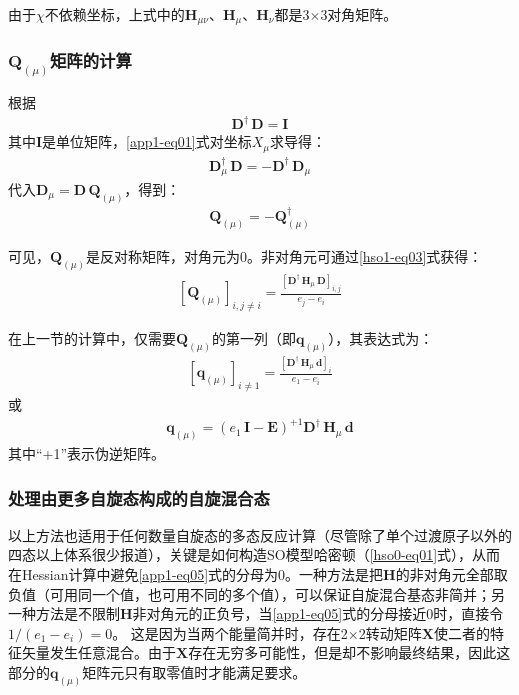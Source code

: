 \documentclass[UTF8]{ctexart}
\begin{document}
由于$\chi$不依赖坐标，上式中的$\mathbf{H}_{\mu\nu}$、$\mathbf{H}_\mu$、$\mathbf{H}_\nu$都是3$\times$3对角矩阵。


\subsubsection{$\mathbf{Q}_{(\mu)}$矩阵的计算}

根据
\begin{align}\label{app1-eq01}
\mathbf{D}^\dagger \, \mathbf{D} = \mathbf{I}
\end{align}
其中$\mathbf{I}$是单位矩阵，\eqref{app1-eq01}式对坐标$X_\mu$求导得：
\begin{align}\label{app1-eq02}
\mathbf{D}_\mu^\dagger \, \mathbf{D} = -\mathbf{D}^\dagger \, \mathbf{D}_\mu
\end{align}
代入$\mathbf{D}_\mu = \mathbf{D} \, \mathbf{Q}_{(\mu)}$，得到：
\begin{align}\label{app1-eq03}
\mathbf{Q}_{(\mu)} = -\mathbf{Q}_{(\mu)}^\dagger
\end{align}

可见，$\mathbf{Q}_{(\mu)}$是反对称矩阵，对角元为0。非对角元可通过\eqref{hso1-eq03}式获得：
\begin{align}\label{app1-eq04}
\left[\mathbf{Q}_{(\mu)}\right]_{i, j\neq i} = \frac{\left[\mathbf{D}^\dagger \, \mathbf{H}_\mu \, \mathbf{D}\right]_{i, j}}{e_j - e_i}
\end{align}

在上一节的计算中，仅需要$\mathbf{Q}_{(\mu)}$的第一列（即$\mathbf{q}_{(\mu)}$），其表达式为：
\begin{align}\label{app1-eq05}
\left[\mathbf{q}_{(\mu)}\right]_{i\neq 1} = \frac{\left[\mathbf{D}^\dagger \, \mathbf{H}_\mu \, \mathbf{d}\right]_i}{e_1 - e_i}
\end{align}
或
\begin{align}\label{app1-eq06}
\mathbf{q}_{(\mu)} = \left(e_1 \, \mathbf{I} - \mathbf{E}\right)^{+1}\mathbf{D}^\dagger \, \mathbf{H}_\mu \, \mathbf{d}
\end{align}
其中“+1”表示伪逆矩阵。

\subsubsection{处理由更多自旋态构成的自旋混合态}

以上方法也适用于任何数量自旋态的多态反应计算（尽管除了单个过渡原子以外的四态以上体系很少报道），关键是如何构造SO模型哈密顿（\eqref{hso0-eq01}式），从而在Hessian计算中避免\eqref{app1-eq05}式的分母为0。一种方法是把$\mathbf{H}$的非对角元全部取负值（可用同一个值，也可用不同的多个值），可以保证自旋混合基态非简并；另一种方法是不限制$\mathbf{H}$非对角元的正负号，当\eqref{app1-eq05}式的分母接近0时，直接令$1/(e_1 - e_i) = 0$。
这是因为当两个能量简并时，存在2$\times$2转动矩阵$\mathbf{X}$使二者的特征矢量发生任意混合。由于$\mathbf{X}$存在无穷多可能性，但是却不影响最终结果，因此这部分的$\mathbf{q}_{(\mu)}$矩阵元只有取零值时才能满足要求。
\end{document}
